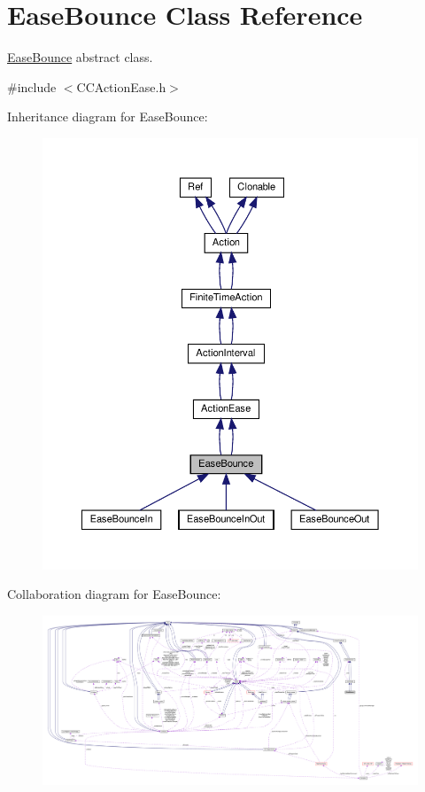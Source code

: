 \hypertarget{classEaseBounce}{}\section{Ease\+Bounce Class Reference}
\label{classEaseBounce}


\hyperlink{classEaseBounce}{Ease\+Bounce} abstract class.  




{\ttfamily \#include $<$C\+C\+Action\+Ease.\+h$>$}



Inheritance diagram for Ease\+Bounce\+:
\nopagebreak
\begin{figure}[H]
\begin{center}
\leavevmode
\includegraphics[width=350pt]{classEaseBounce__inherit__graph}
\end{center}
\end{figure}


Collaboration diagram for Ease\+Bounce\+:
\nopagebreak
\begin{figure}[H]
\begin{center}
\leavevmode
\includegraphics[width=350pt]{classEaseBounce__coll__graph}
\end{center}
\end{figure}
